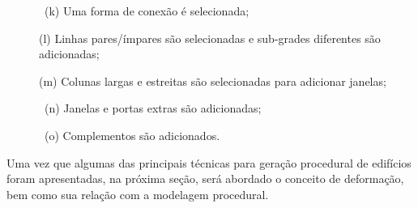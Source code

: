 \begin{description}
    \item[] \, (k) Uma forma de conexão é selecionada;
    
    \item[] \; (l) Linhas pares/ímpares são selecionadas e sub-grades diferentes são adicionadas;
    
    \item[] (m) Colunas largas e estreitas são selecionadas para adicionar janelas;
    
    \item[] \, (n) Janelas e portas extras são adicionadas;
    
    \item[] \, (o) Complementos são adicionados.
\end{description}

\begin{figure}[h!]
	\centering
	\captionsetup{width=15cm}
	{}	
\end{figure}

\vspace{0.5cm}

\newpage

Uma vez que algumas das principais técnicas para geração procedural de edifícios foram apresentadas, na próxima seção, será abordado o conceito de deformação, bem como sua relação com a modelagem procedural.

